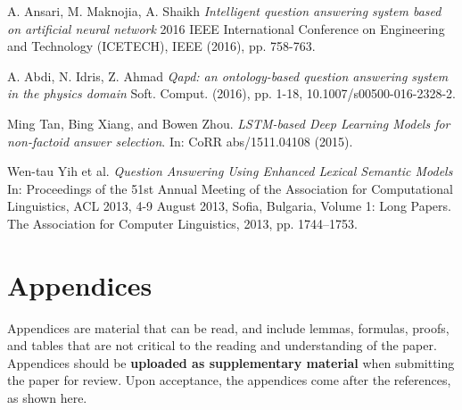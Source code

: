 \documentclass[11pt,a4paper]{article}
\begin{document}
\begin{thebibliography}{}
 A. Ansari, M. Maknojia, A. Shaikh \emph{Intelligent question answering system based on artificial neural network} 2016 IEEE International Conference on Engineering and Technology (ICETECH), IEEE (2016), pp. 758-763.

 A. Abdi, N. Idris, Z. Ahmad \emph{Qapd: an ontology-based question answering system in the physics domain} Soft. Comput. (2016), pp. 1-18, 10.1007/s00500-016-2328-2.

 Ming Tan, Bing Xiang, and Bowen Zhou. \emph{LSTM-based Deep Learning Models for non-factoid answer selection}. In: CoRR abs/1511.04108 (2015).

 Wen-tau Yih et al. \emph{Question Answering Using Enhanced Lexical Semantic Models} In: Proceedings of the 51st Annual Meeting of the Association for Computational Linguistics, ACL 2013, 4-9 August 2013, Sofia, Bulgaria, Volume 1: Long Papers. The Association for Computer Linguistics, 2013, pp. 1744–1753.


\end{thebibliography}



\appendix

\section{Appendices}
\label{sec:appendix}
Appendices are material that can be read, and include lemmas, formulas, proofs, and tables that are not critical to the reading and understanding of the paper. 
Appendices should be \textbf{uploaded as supplementary material} when submitting the paper for review.
Upon acceptance, the appendices come after the references, as shown here.
\end{document}

